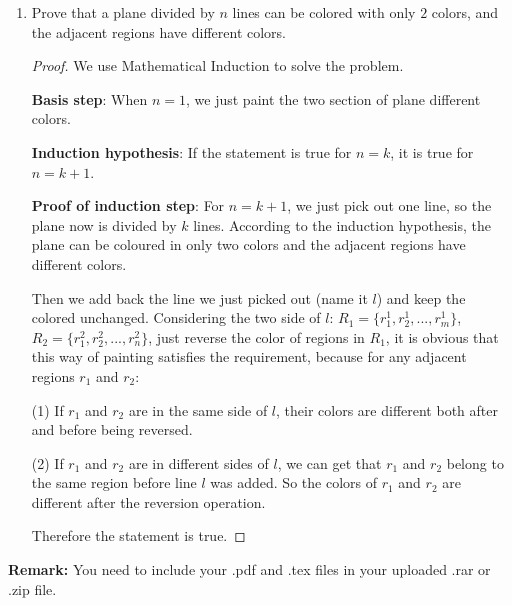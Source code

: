 \documentclass[12pt,a4paper]{article}
\theoremstyle{definition}
\begin{document}
\begin{enumerate}
\begin{proof}
       Therefore, the statement is true.
   
       



    \end{proof}

    \item
    Prove that a plane divided by $n$ lines can be colored with only $2$ colors, and the adjacent regions have different colors.
    \begin{proof}
        We use Mathematical Induction to solve the problem.
        
        \textbf{Basis step}: When $n = 1$, we just paint the two section of plane different colors.
        
        \textbf{Induction hypothesis}: If the statement is true for $n = k$, it is true for $n = k + 1$.
        
        \textbf{Proof of induction step}: For $n = k + 1$, we just pick out one line, so the plane now is divided by
        $k$ lines. According to the induction hypothesis, the plane can be coloured in only two colors and the adjacent
        regions have different colors.

        Then we add back the line we just picked out (name it $l$) and keep the colored unchanged. Considering the two side of $l$:
        $R_1 = \{r^{1}_{1}, r^{1}_{2}, ..., r^{1}_{m}\}$, $R_2 = \{r^{2}_{1}, r^{2}_{2}, ..., r^{2}_{n}\}$, just reverse the color of regions
        in $R_1$, it is obvious that this way of painting satisfies the requirement, because for any adjacent regions $r_1$ and $r_2$:

        (1) If $r_1$ and $r_2$ are in the same side of $l$, their colors are different both after and before being reversed.

        (2) If $r_1$ and $r_2$ are in different sides of $l$, we can get that $r_1$ and $r_2$ belong to the same region before line $l$ was added.
        So the colors of $r_1$ and $r_2$ are different after the reversion operation.

        Therefore the statement is true.
    \end{proof}

\end{enumerate}

\vspace{20pt}

\textbf{Remark:} You need to include your .pdf and .tex files in your uploaded .rar or .zip file.

\end{document}
